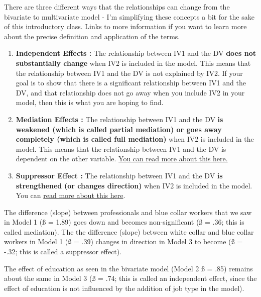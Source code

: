 \documentclass[
  letterpaper,
  DIV=11,
  numbers=noendperiod,
  oneside]{scrreprt}
\begin{document}
There are three different ways that the relationships can change from
the bivariate to multivariate model - I'm simplifying these concepts a
bit for the sake of this introductory class. Links to more information
if you want to learn more about the precise definition and application
of the terms.~

\begin{enumerate}
\def\labelenumi{\arabic{enumi}.}
\item
  \textbf{Independent Effects :} The relationship between IV1 and the DV
  \textbf{does not substantially change} when IV2 is included in the
  model. This means that the relationship between IV1 and the DV is not
  explained by IV2. If your goal is to show that there is a significant
  relationship between IV1 and the DV, and that relationship does not go
  away when you include IV2 in your model, then this is what you are
  hoping to find.
\item
  \textbf{Mediation Effects :} The relationship between IV1 and the DV
  \textbf{is weakened (which is called partial mediation) or goes away
  completely (which is called full mediation)} when IV2 is included in
  the model. This means that the relationship between IV1 and the DV is
  dependent on the other variable.
  \href{http://davidakenny.net/cm/mediate.htm}{You can read more about
  this here.}~
\item
  \textbf{Suppressor Effect :} The relationship between IV1 and the DV
  \textbf{is strengthened} \textbf{(or changes direction)} when IV2 is
  included in the model. You can
  \href{http://stats.stackexchange.com/questions/73869/suppression-effect-in-regression-definition-and-visual-explanation-depiction}{read
  more about this here}.~
\end{enumerate}

\begin{tcolorbox}[enhanced jigsaw, toptitle=1mm, toprule=.15mm, rightrule=.15mm, breakable, left=2mm, colbacktitle=quarto-callout-tip-color!10!white, colback=white, opacityback=0, coltitle=black, bottomtitle=1mm, opacitybacktitle=0.6, titlerule=0mm, leftrule=.75mm, arc=.35mm, bottomrule=.15mm, title=\textcolor{quarto-callout-tip-color}{\faLightbulb}\hspace{0.5em}{ACTIVITY : Look over the models. How do the slopes change from Model 1
to Model 3? From Model 2 to Model 3?}, colframe=quarto-callout-tip-color-frame]

The difference (slope) between professionals and blue collar workers
that we saw in Model 1 (ß = 1.89) goes down and becomes non-significant
(ß = .36; this is called mediation). The the difference (slope) between
white collar and blue collar workers in Model 1 (ß = .39) changes in
direction in Model 3 to become (ß = -.32; this is called a suppressor
effect).

The effect of education as seen in the bivariate model (Model 2 ß = .85)
remains about the same in Model 3 (ß = .74; this is called an
independent effect, since the effect of education is not influenced by
the addition of job type in the model).

\end{tcolorbox}
\end{document}
